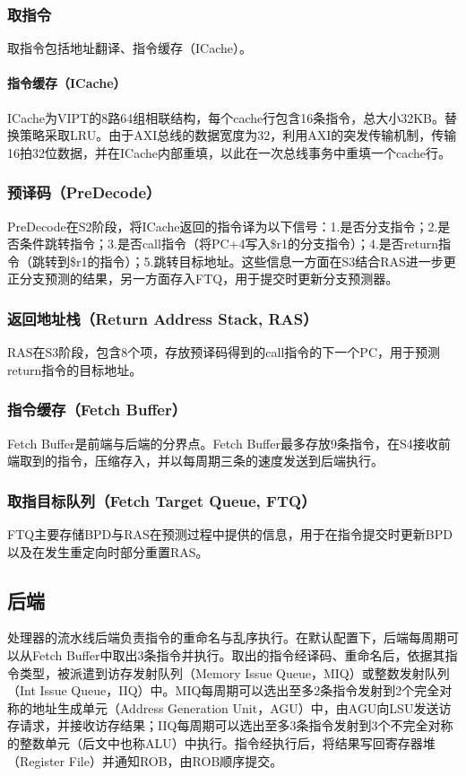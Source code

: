 \documentclass{article}
\begin{document}
\subsubsection{取指令}
取指令包括地址翻译、指令缓存（ICache）。\par
\paragraph{指令缓存（ICache）}
ICache为VIPT的8路64组相联结构，每个cache行包含16条指令，总大小32KB。替换策略采取LRU。由于AXI总线的数据宽度为32，利用AXI的突发传输机制，传输16拍32位数据，并在ICache内部重填，以此在一次总线事务中重填一个cache行。\par
\subsubsection{预译码（PreDecode）}
PreDecode在S2阶段，将ICache返回的指令译为以下信号：1.是否分支指令；2.是否条件跳转指令；3.是否call指令（将PC+4写入\$r1的分支指令）；4.是否return指令（跳转到\$r1的指令）；5.跳转目标地址。这些信息一方面在S3结合RAS进一步更正分支预测的结果，另一方面存入FTQ，用于提交时更新分支预测器。
\subsubsection{返回地址栈（Return Address Stack, RAS）}
RAS在S3阶段，包含8个项，存放预译码得到的call指令的下一个PC，用于预测return指令的目标地址。
\subsubsection{指令缓存（Fetch Buffer）}
Fetch Buffer是前端与后端的分界点。Fetch Buffer最多存放9条指令，在S4接收前端取到的指令，压缩存入，并以每周期三条的速度发送到后端执行。
\subsubsection{取指目标队列（Fetch Target Queue, FTQ）}
FTQ主要存储BPD与RAS在预测过程中提供的信息，用于在指令提交时更新BPD以及在发生重定向时部分重置RAS。

\subsection{后端}
处理器的流水线后端负责指令的重命名与乱序执行。在默认配置下，后端每周期可以从Fetch Buffer中取出3条指令并执行。取出的指令经译码、重命名后，依据其指令类型，被派遣到访存发射队列（Memory Issue Queue，MIQ）或整数发射队列（Int Issue Queue，IIQ）中。MIQ每周期可以选出至多2条指令发射到2个完全对称的地址生成单元（Address Generation Unit，AGU）中，由AGU向LSU发送访存请求，并接收访存结果；IIQ每周期可以选出至多3条指令发射到3个不完全对称的整数单元（后文中也称ALU）中执行。指令经执行后，将结果写回寄存器堆（Register File）并通知ROB，由ROB顺序提交。\par
\end{document}
